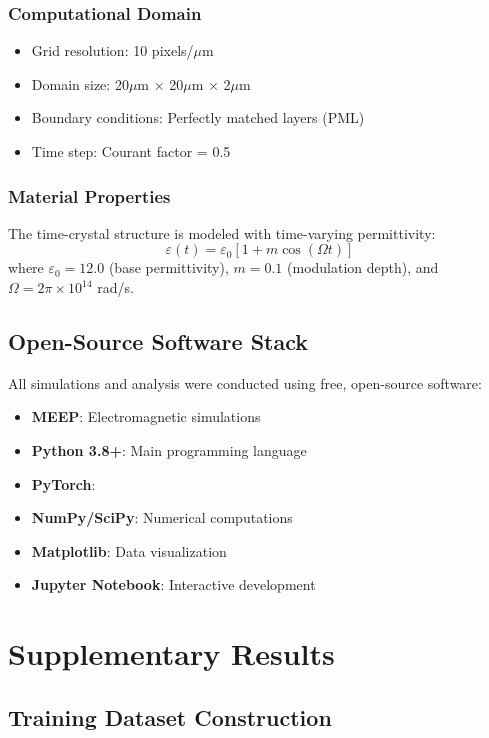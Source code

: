 \documentclass[11pt]{article}
\begin{document}
\subsubsection{Computational Domain}
\begin{itemize}
    \item Grid resolution: 10 pixels/$\mu$m
    \item Domain size: 20$\mu$m × 20$\mu$m × 2$\mu$m
    \item Boundary conditions: Perfectly matched layers (PML)
    \item Time step: Courant factor = 0.5
\end{itemize}

\subsubsection{Material Properties}
The time-crystal structure is modeled with time-varying permittivity:
\begin{equation}
\varepsilon(t) = \varepsilon_0[1 + m\cos(\Omega t)]
\end{equation}
where $\varepsilon_0 = 12.0$ (base permittivity), $m = 0.1$ (modulation depth), and $\Omega = 2\pi \times 10^{14}$ rad/s.

\subsection{Open-Source Software Stack}

All simulations and analysis were conducted using free, open-source software:

\begin{itemize}
    \item \textbf{MEEP}: Electromagnetic simulations
    \item \textbf{Python 3.8+}: Main programming language
    \item \textbf{PyTorch}: 
    \item \textbf{NumPy/SciPy}: Numerical computations
    \item \textbf{Matplotlib}: Data visualization
    \item \textbf{Jupyter Notebook}: Interactive development
\end{itemize}

\section{Supplementary Results}

\subsection{Training Dataset Construction}
\end{document}
